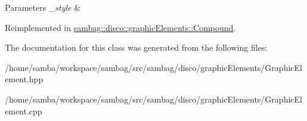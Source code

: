 \begin{DoxyParams}{Parameters}
{\em \_\-style} & \\
\hline
\end{DoxyParams}


Reimplemented in \hyperlink{classsambag_1_1disco_1_1graphic_elements_1_1_compound_a7a36ede1ba0ed02f7928d03a8dbaa36e}{sambag::disco::graphicElements::Compound}.



The documentation for this class was generated from the following files:\begin{DoxyCompactItemize}
\item 
/home/samba/workspace/sambag/src/sambag/disco/graphicElements/GraphicElement.hpp\item 
/home/samba/workspace/sambag/src/sambag/disco/graphicElements/GraphicElement.cpp\end{DoxyCompactItemize}
